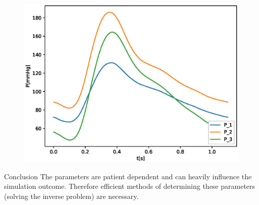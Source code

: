 \documentclass{beamer}
\begin{document}
\begin{frame}
\begin{figure}
\begin{center}
\begin{minipage}[t][0.35\paperheight][t]{\textwidth}
\begin{minipage}{0.44\textwidth}
					\includegraphics[width=\textwidth]{images/compare_output_params_P_P.eps}
				\end{minipage}
			\end{minipage}
		\end{center}
	\end{figure}
	\begin{minipage}[t][0.44\paperheight][t]{\textwidth}
		\hfill
		\begin{block}{Conclusion}
			The parameters are patient dependent and can heavily influence the simulation outcome. Therefore efficient methods of determining these parameters (solving the inverse problem) are necessary.
		\end{block}
	\end{minipage}
\end{frame}
\end{document}
